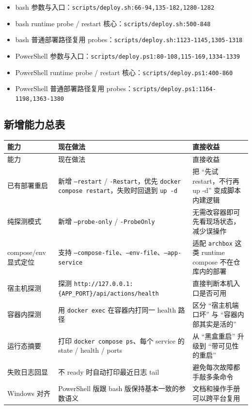 \documentclass[a4paper]{article}
\newcommand{\filepath}[1]{\nolinkurl{#1}}
\begin{document}
\begin{itemize}
\item bash 参数与入口：\filepath{scripts/deploy.sh:66-94,135-182,1280-1282}
\item bash runtime probe / restart 核心：\filepath{scripts/deploy.sh:500-848}
\item bash 普通部署路径复用 probes：\filepath{scripts/deploy.sh:1123-1145,1305-1318}
\item PowerShell 参数与入口：\filepath{scripts/deploy.ps1:80-108,115-169,1334-1339}
\item PowerShell runtime probe / restart 核心：\filepath{scripts/deploy.ps1:400-860}
\item PowerShell 普通部署路径复用 probes：\filepath{scripts/deploy.ps1:1164-1198,1363-1380}
\end{itemize}

\subsection{新增能力总表}

\begin{longtable}{p{3.1cm}p{5.1cm}p{5.5cm}}
\toprule
能力 & 现在做法 & 直接收益 \\
\midrule
\endfirsthead
\toprule
能力 & 现在做法 & 直接收益 \\
\midrule
\endhead
已有部署重启 & 新增 \texttt{--restart} / \texttt{-Restart}，优先 \texttt{docker compose restart}，失败时回退到 \texttt{up -d} & 把 ``先试 restart，不行再 up -d'' 变成脚本内建逻辑 \\
纯探测模式 & 新增 \texttt{--probe-only} / \texttt{-ProbeOnly} & 无需改容器即可先看现场状态，减少误操作 \\
compose/env 显式定位 & 支持 \texttt{--compose-file}、\texttt{--env-file}、\texttt{--app-service} & 适配 \texttt{archbox} 这类 runtime compose 不在仓库内的部署 \\
宿主机探测 & 探测 \texttt{http://127.0.0.1:\{APP\_PORT\}/api/actions/health} & 直接判断本机入口是否可用 \\
容器内探测 & 用 \texttt{docker exec} 在容器内打同一 health 路径 & 区分 ``宿主机端口坏'' 与 ``容器内部其实是活的'' \\
运行态摘要 & 打印 \texttt{docker compose ps}、每个 service 的 state / health / ports & 从 ``黑盒重启'' 升级到 ``带可见性的重启'' \\
失败日志回显 & 不 ready 时自动打印最近日志 tail & 避免每次故障都手敲多条命令 \\
Windows 对齐 & PowerShell 版跟 bash 版保持基本一致的参数语义 & 文档和操作手册可以跨平台复用 \\
\bottomrule
\end{longtable}
\end{document}
